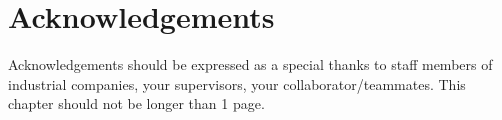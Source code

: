 \chapter*{Acknowledgements}
	
	Acknowledgements should be expressed as a special thanks to staff members of industrial companies, your supervisors, your collaborator/teammates. This chapter should not be longer than 1 page.
	
	\lipsum[1-2]